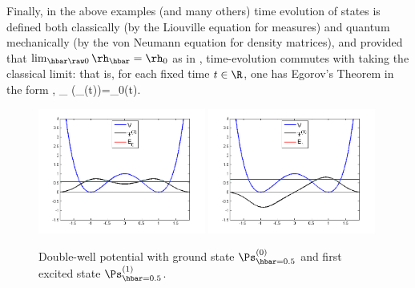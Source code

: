 \documentclass[12pt]{article}
\begin{document}
Finally, in the above examples (and many others) time evolution of states  is defined both classically (by the Liouville equation for measures) and quantum mechanically (by the von Neumann equation for density matrices), and provided that $\lim_{\hbar\raw 0}\rh_{\hbar}=\rh_0$ as in ,
time-evolution commutes with taking the classical limit: that is, 
for each fixed time $t\in\R$, one has Egorov's Theorem in the form \cite[Thm.\ II.2.7.2]{book}, \cite{Robert}
\beq
\lim_{\hbar{}} (\rh_{\hbar}(t))=\rh_0(t). \label{egorov}
\eeq
\newpage
 \begin{figure}[H]
\begin{center}
\includegraphics[width=0.49\textwidth]{ZeroState.png}
\includegraphics[width=0.49\textwidth]{FirstState.png}
\caption{Double-well potential with ground state $\Ps_{\hbar=0.5}^{(0)}$ and first excited state $\Ps_{\hbar=0.5}^{(1)}$.}
\label{QMDubbelePut}
\end{center}
\end{figure}
\end{document}
